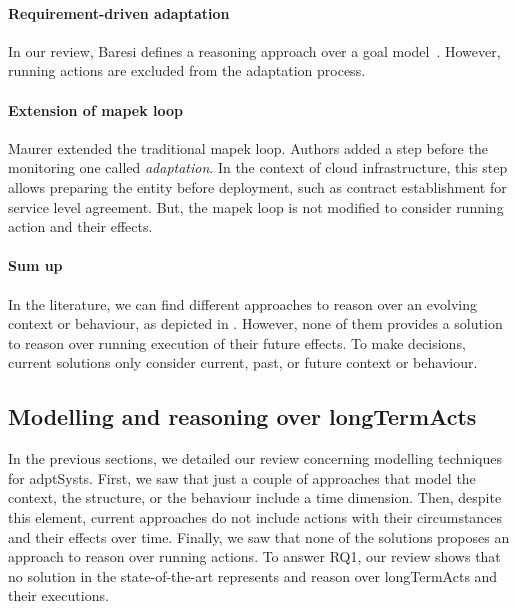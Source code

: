 \paragraph{Requirement-driven adaptation}
In our review, Baresi \etal defines a reasoning approach over a goal model~\cite{DBLP:conf/re/BaresiPS10}.
However, running \glspl{action} are excluded from the adaptation process.

\paragraph{Extension of \gls{mapek} loop}
Maurer \etal \cite{DBLP:conf/iscc/MaurerBEB11} extended the traditional \gls{mapek} loop.
Authors added a step before the monitoring one called \textit{adaptation}.
In the context of cloud infrastructure, this step allows preparing the entity before deployment, such as contract establishment for service level agreement.
But, the \gls{mapek} loop is not modified to consider running \gls{action} and their effects.

\paragraph{Sum up}

In the literature, we can find different approaches to reason over an evolving context or behaviour, as depicted in .
However, none of them provides a solution to reason over running execution of their future effects.
To make decisions, current solutions only consider current, past, or future context or \gls{behaviour}.

\subsection[Modelling and reasoning over long-term actions]{Modelling and reasoning over \glspl{longTermAct}}
In the previous sections, we detailed our review concerning modelling techniques for \glspl{adptSyst}.
First, we saw that just a couple of approaches that model the \gls{context}, the \gls{structure}, or the \gls{behaviour} include a time dimension.
Then, despite this element, current approaches do not include \glspl{action} with their circumstances and their effects over time.
Finally, we saw that none of the solutions proposes an approach to reason over running \glspl{action}.
To answer RQ1, our review shows that no solution in the state-of-the-art represents and reason over \glspl{longTermAct} and their executions.












